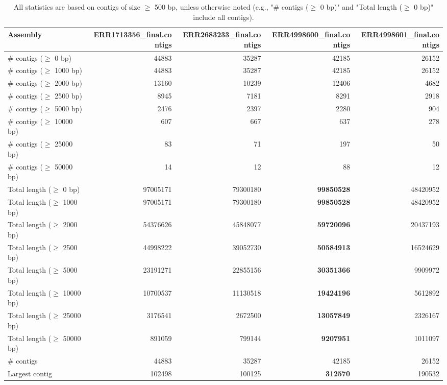 \documentclass[12pt,a4paper]{article}
\begin{document}
\begin{table}[ht]
\begin{center}
\caption{All statistics are based on contigs of size $\geq$ 500 bp, unless otherwise noted (e.g., "\# contigs ($\geq$ 0 bp)" and "Total length ($\geq$ 0 bp)" include all contigs).}
\begin{tabular}{|l*{4}{|r}|}
\hline
Assembly & ERR1713356\_final.contigs & ERR2683233\_final.contigs & ERR4998600\_final.contigs & ERR4998601\_final.contigs \\ \hline
\# contigs ($\geq$ 0 bp) & 44883 & 35287 & 42185 & 26152 \\ \hline
\# contigs ($\geq$ 1000 bp) & 44883 & 35287 & 42185 & 26152 \\ \hline
\# contigs ($\geq$ 2000 bp) & 13160 & 10239 & 12406 & 4682 \\ \hline
\# contigs ($\geq$ 2500 bp) & 8945 & 7181 & 8291 & 2918 \\ \hline
\# contigs ($\geq$ 5000 bp) & 2476 & 2397 & 2280 & 904 \\ \hline
\# contigs ($\geq$ 10000 bp) & 607 & 667 & 637 & 278 \\ \hline
\# contigs ($\geq$ 25000 bp) & 83 & 71 & 197 & 50 \\ \hline
\# contigs ($\geq$ 50000 bp) & 14 & 12 & 88 & 12 \\ \hline
Total length ($\geq$ 0 bp) & 97005171 & 79300180 & {\bf 99850528} & 48420952 \\ \hline
Total length ($\geq$ 1000 bp) & 97005171 & 79300180 & {\bf 99850528} & 48420952 \\ \hline
Total length ($\geq$ 2000 bp) & 54376626 & 45848077 & {\bf 59720096} & 20437193 \\ \hline
Total length ($\geq$ 2500 bp) & 44998222 & 39052730 & {\bf 50584913} & 16524629 \\ \hline
Total length ($\geq$ 5000 bp) & 23191271 & 22855156 & {\bf 30351366} & 9909972 \\ \hline
Total length ($\geq$ 10000 bp) & 10700537 & 11130518 & {\bf 19424196} & 5612892 \\ \hline
Total length ($\geq$ 25000 bp) & 3176541 & 2672500 & {\bf 13057849} & 2326167 \\ \hline
Total length ($\geq$ 50000 bp) & 891059 & 799144 & {\bf 9207951} & 1011097 \\ \hline
\# contigs & 44883 & 35287 & 42185 & 26152 \\ \hline
Largest contig & 102498 & 100125 & {\bf 312570} & 190532 \\ \hline

\end{tabular}
\end{center}
\end{table}
\end{document}
